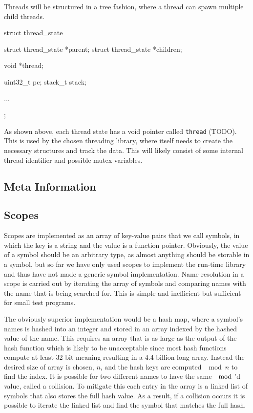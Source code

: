 Threads will be structured in a tree fashion, where a thread can spawn multiple
child threads.
\begin{ccode}
struct thread_state {
    struct thread_state *parent;
    struct thread_state *children;

    void *thread;

    uint32_t pc;
    stack_t stack;

    ...
};
\end{ccode}

As shown above, each thread state has a void pointer called {\tt thread}
(TODO). This is used by the chosen threading library, where itself needs to
create the necessary structures and track the data. This will likely consist of
some internal thread identifier and possible mutex variables.

\subsection{Meta Information}
\label{sec:implementation:meta}


\subsection{Scopes}

Scopes are implemented as an array of key-value pairs that we call symbols, in
which the key is a string and the value is a function pointer. Obviously, the
value of a symbol should be an arbitrary type, as almost anything should be
storable in a symbol, but so far we have only used scopes to implement the
run-time library and thus have not made a generic symbol implementation. Name
resolution in a scope is carried out by iterating the array of symbols and
comparing names with the name that is being searched for. This is simple and
inefficient but sufficient for small test programs.

The obviously superior implementation would be a hash map, where a symbol's
names is hashed into an integer and stored in an array indexed by the hashed
value of the name. This requires an array that is as large as the output of the
hash function which is likely to be unacceptable since most hash functions
compute at least 32-bit meaning resulting in a 4.4 billion long array. Instead
the desired size of array is chosen, $n$, and the hash keys are computed
$\mod n$ to find the index. It is possible for two different names to have the
same $\mod$'d value, called a collision. To mitigate this each entry in the
array is a linked list of symbols that also stores the full hash value. As a
result, if a collision occurs it is possible to iterate the linked list and find
the symbol that matches the full hash.

